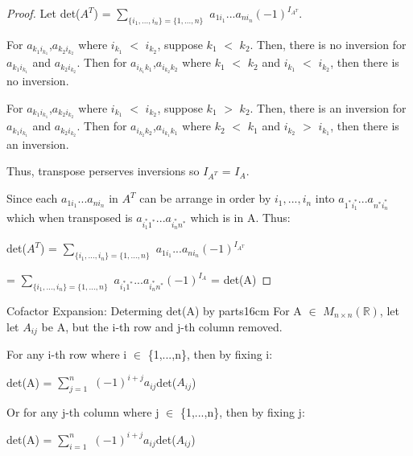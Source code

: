     \begin{proof}
        Let det($A^T$) =
        $\sum_{\{i_1,...,i_n\} = \{1,...,n\}}$
            $a_{1i_1}...a_{ni_n}(-1)^{I_{A^T}}$.
        
        For $a_{k_1i_{k_1}}$,$a_{k_2i_{k_2}}$
        where $i_{k_1}$ $<$ $i_{k_2}$, suppose $k_1$ $<$ $k_2$.
        Then, there is no inversion for $a_{k_1i_{k_1}}$
        and $a_{k_2i_{k_2}}$.
        Then for $a_{i_{k_1}k_1}$,$a_{i_{k_2}k_2}$
        where $k_1$ $<$ $k_2$ and $i_{k_1}$ $<$ $i_{k_2}$,
        then there is no inversion.

        For $a_{k_1i_{k_1}}$,$a_{k_2i_{k_2}}$
        where $i_{k_1}$ $<$ $i_{k_2}$, suppose $k_1$ $>$ $k_2$.
        Then, there is an inversion for $a_{k_1i_{k_1}}$
        and $a_{k_2i_{k_2}}$.
        Then for $a_{i_{k_2}k_2}$,$a_{i_{k_1}k_1}$
        where $k_2$ $<$ $k_1$ and $i_{k_2}$ $>$ $i_{k_1}$,
        then there is an inversion.

        Thus, transpose perserves inversions
        so $I_{A^T}$ = $I_A$.

        Since each $a_{1i_1}...a_{ni_n}$ in $A^T$
        can be arrange in order by $i_1,...,i_n$
        into $a_{1^*i_1^*}...a_{n^*i_n^*}$
        which when transposed is $a_{i_1^*1^*}...a_{i_n^*n^*}$
        which is in A. Thus:

        \hspace{0.5cm}
        det($A^T$) =
        $\sum_{\{i_1,...,i_n\} = \{1,...,n\}}$
            $a_{1i_1}...a_{ni_n}(-1)^{I_{A^T}}$

        \hspace{2.1cm}
        = $\sum_{\{i_1,...,i_n\} = \{1,...,n\}}$
            $a_{i_1^*1^*}...a_{i_n^*n^*}(-1)^{I_A}$
        = det(A)
    \end{proof}

    \newpage



    \begin{wtheorem}{Cofactor Expansion: Determing det(A) by parts}{16cm}
        For A $\in$ $M_{n \times n}(\mathbb{R})$, let
        let $A_{ij}$ be A, but the i-th row and j-th column removed.
        
        For any i-th row where i $\in$ \{1,...,n\}, then by fixing i:

        \hspace{0.5cm}
        det(A) = $\sum_{j=1}^n$ $(-1)^{i+j}a_{ij}$det($A_{ij}$)

        Or for any j-th column where j $\in$ \{1,...,n\}, then by fixing j:

        \hspace{0.5cm}
        det(A) = $\sum_{i=1}^n$ $(-1)^{i+j}a_{ij}$det($A_{ij}$)
    \end{wtheorem}

